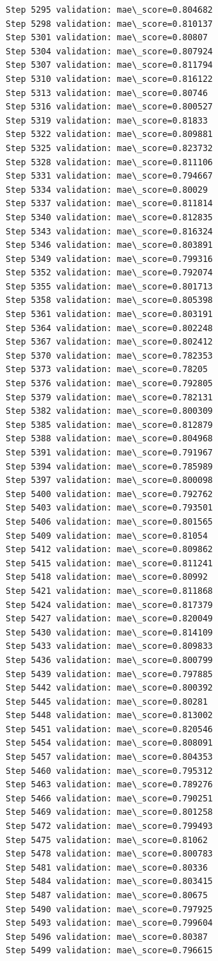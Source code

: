 \documentclass[11pt]{article}
\begin{document}
\begin{Verbatim}[commandchars=\\\{\}]
Step 5295 validation: mae\_score=0.804682
Step 5298 validation: mae\_score=0.810137
Step 5301 validation: mae\_score=0.80807
Step 5304 validation: mae\_score=0.807924
Step 5307 validation: mae\_score=0.811794
Step 5310 validation: mae\_score=0.816122
Step 5313 validation: mae\_score=0.80746
Step 5316 validation: mae\_score=0.800527
Step 5319 validation: mae\_score=0.81833
Step 5322 validation: mae\_score=0.809881
Step 5325 validation: mae\_score=0.823732
Step 5328 validation: mae\_score=0.811106
Step 5331 validation: mae\_score=0.794667
Step 5334 validation: mae\_score=0.80029
Step 5337 validation: mae\_score=0.811814
Step 5340 validation: mae\_score=0.812835
Step 5343 validation: mae\_score=0.816324
Step 5346 validation: mae\_score=0.803891
Step 5349 validation: mae\_score=0.799316
Step 5352 validation: mae\_score=0.792074
Step 5355 validation: mae\_score=0.801713
Step 5358 validation: mae\_score=0.805398
Step 5361 validation: mae\_score=0.803191
Step 5364 validation: mae\_score=0.802248
Step 5367 validation: mae\_score=0.802412
Step 5370 validation: mae\_score=0.782353
Step 5373 validation: mae\_score=0.78205
Step 5376 validation: mae\_score=0.792805
Step 5379 validation: mae\_score=0.782131
Step 5382 validation: mae\_score=0.800309
Step 5385 validation: mae\_score=0.812879
Step 5388 validation: mae\_score=0.804968
Step 5391 validation: mae\_score=0.791967
Step 5394 validation: mae\_score=0.785989
Step 5397 validation: mae\_score=0.800098
Step 5400 validation: mae\_score=0.792762
Step 5403 validation: mae\_score=0.793501
Step 5406 validation: mae\_score=0.801565
Step 5409 validation: mae\_score=0.81054
Step 5412 validation: mae\_score=0.809862
Step 5415 validation: mae\_score=0.811241
Step 5418 validation: mae\_score=0.80992
Step 5421 validation: mae\_score=0.811868
Step 5424 validation: mae\_score=0.817379
Step 5427 validation: mae\_score=0.820049
Step 5430 validation: mae\_score=0.814109
Step 5433 validation: mae\_score=0.809833
Step 5436 validation: mae\_score=0.800799
Step 5439 validation: mae\_score=0.797885
Step 5442 validation: mae\_score=0.800392
Step 5445 validation: mae\_score=0.80281
Step 5448 validation: mae\_score=0.813002
Step 5451 validation: mae\_score=0.820546
Step 5454 validation: mae\_score=0.808091
Step 5457 validation: mae\_score=0.804353
Step 5460 validation: mae\_score=0.795312
Step 5463 validation: mae\_score=0.789276
Step 5466 validation: mae\_score=0.790251
Step 5469 validation: mae\_score=0.801258
Step 5472 validation: mae\_score=0.799493
Step 5475 validation: mae\_score=0.81062
Step 5478 validation: mae\_score=0.800783
Step 5481 validation: mae\_score=0.80336
Step 5484 validation: mae\_score=0.803415
Step 5487 validation: mae\_score=0.80675
Step 5490 validation: mae\_score=0.797925
Step 5493 validation: mae\_score=0.799604
Step 5496 validation: mae\_score=0.80387
Step 5499 validation: mae\_score=0.796615
    \end{Verbatim}
\end{document}
